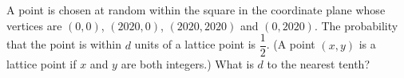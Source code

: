 A point is chosen at random within the square in the coordinate plane whose vertices are $(0,0)$, $(2020,0)$, $(2020,2020)$ and $(0,2020)$. The probability that the point is within $d$ units of a lattice point is $\dfrac12$. (A point $(x,y)$ is a lattice point if $x$ and $y$ are both integers.) What is $d$ to the nearest tenth?
